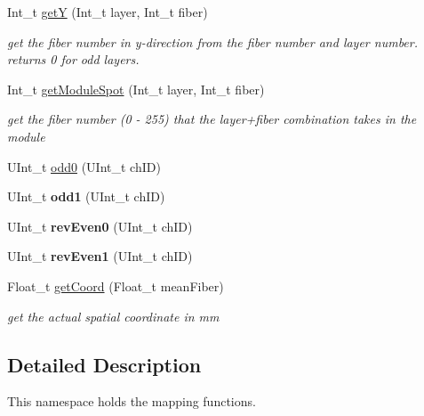 \begin{DoxyCompactItemize}
\mbox{\label{namespacemapping_a24d3fe7e5b7af74cd5215d2930a5c877}} 
Int\+\_\+t \hyperlink{namespacemapping_a24d3fe7e5b7af74cd5215d2930a5c877}{getY} (Int\+\_\+t layer, Int\+\_\+t fiber)
\begin{DoxyCompactList}\small\item\em get the fiber number in y-\/direction from the fiber number and layer number. returns 0 for odd layers. \end{DoxyCompactList}\item 
\mbox{\label{namespacemapping_a4472aa4e6cd75914285a1c985c09b068}} 
Int\+\_\+t \hyperlink{namespacemapping_a4472aa4e6cd75914285a1c985c09b068}{get\+Module\+Spot} (Int\+\_\+t layer, Int\+\_\+t fiber)
\begin{DoxyCompactList}\small\item\em get the fiber number (0 -\/ 255) that the layer+fiber combination takes in the module \end{DoxyCompactList}\item 
U\+Int\+\_\+t \hyperlink{namespacemapping_a00520b73ed7ad6ada40fe422bf20b4b7}{odd0} (U\+Int\+\_\+t ch\+ID)
\item 
\mbox{\label{namespacemapping_ada62caaf027acc96d2491da32de8ad07}} 
U\+Int\+\_\+t {\bfseries odd1} (U\+Int\+\_\+t ch\+ID)
\item 
\mbox{\label{namespacemapping_a64c663d1d62049966d0915d46abc55ba}} 
U\+Int\+\_\+t {\bfseries rev\+Even0} (U\+Int\+\_\+t ch\+ID)
\item 
\mbox{\label{namespacemapping_a363de8de2a9ea380113fbe5f8d68aa4a}} 
U\+Int\+\_\+t {\bfseries rev\+Even1} (U\+Int\+\_\+t ch\+ID)
\item 
\mbox{\label{namespacemapping_a3d99dd98372f99c279f77b9cfa250411}} 
Float\+\_\+t \hyperlink{namespacemapping_a3d99dd98372f99c279f77b9cfa250411}{get\+Coord} (Float\+\_\+t mean\+Fiber)
\begin{DoxyCompactList}\small\item\em get the actual spatial coordinate in mm \end{DoxyCompactList}\end{DoxyCompactItemize}


\subsection{Detailed Description}
This namespace holds the mapping functions. 

